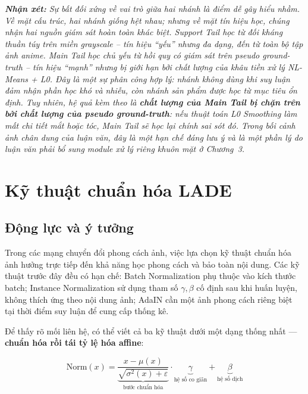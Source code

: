 \medskip
\noindent\textit{\textbf{Nhận xét:} Sự bất đối xứng về vai trò giữa hai nhánh là điểm dễ gây hiểu nhầm. Về mặt \textit{cấu trúc}, hai nhánh giống hệt nhau; nhưng về mặt \textit{tín hiệu học}, chúng nhận hai nguồn giám sát hoàn toàn khác biệt. Support Tail học từ đối kháng thuần túy trên miền grayscale -- tín hiệu ``yếu'' nhưng đa dạng, đến từ toàn bộ tập ảnh anime. Main Tail học chủ yếu từ hồi quy có giám sát trên pseudo ground-truth -- tín hiệu ``mạnh'' nhưng bị giới hạn bởi chất lượng của khâu tiền xử lý NL-Means + L0. Đây là một sự phân công hợp lý: nhánh không dùng khi suy luận đảm nhận phần học khó và nhiễu, còn nhánh sản phẩm được học từ mục tiêu ổn định. Tuy nhiên, hệ quả kèm theo là \textbf{chất lượng của Main Tail bị chặn trên bởi chất lượng của pseudo ground-truth}: nếu thuật toán L0 Smoothing làm mất chi tiết mắt hoặc tóc, Main Tail sẽ học lại chính sai sót đó. Trong bối cảnh ảnh chân dung của luận văn, đây là một hạn chế đáng lưu ý và là một phần lý do luận văn phải bổ sung module xử lý riêng khuôn mặt ở Chương~3.}

\section{Kỹ thuật chuẩn hóa LADE}
\label{sec:lade}

\subsection{Động lực và ý tưởng}
\label{subsec:lade_motivation}

Trong các mạng chuyển đổi phong cách ảnh, việc lựa chọn kỹ thuật chuẩn hóa ảnh hưởng trực tiếp đến khả năng học phong cách và bảo toàn nội dung. Các kỹ thuật trước đây đều có hạn chế: Batch Normalization \cite{Ioffe2015} phụ thuộc vào kích thước batch; Instance Normalization \cite{Ulyanov2016} sử dụng tham số $\gamma, \beta$ cố định sau khi huấn luyện, không thích ứng theo nội dung ảnh; AdaIN cần một ảnh phong cách riêng biệt tại thời điểm suy luận để cung cấp thống kê.

Để thấy rõ mối liên hệ, có thể viết cả ba kỹ thuật dưới một dạng thống nhất --- \textbf{chuẩn hóa rồi tái tỷ lệ hóa affine}:

\begin{equation}
\label{eq:unified_norm}
\text{Norm}(x) = \underbrace{\frac{x - \mu(x)}{\sqrt{\sigma^2(x) + \varepsilon}}}_{\text{bước chuẩn hóa}} \cdot \underbrace{\gamma}_{\text{hệ số co giãn}} + \underbrace{\beta}_{\text{hệ số dịch}}
\end{equation}

